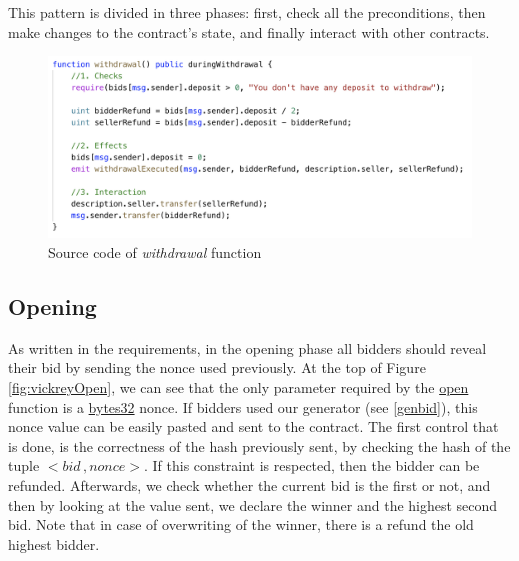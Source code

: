 \documentclass[runningheads,a4paper]{llncs}
\begin{document}
This pattern is divided in three phases: first, check all the preconditions, then make changes to the contract’s state, and finally interact with other contracts.

\begin{figure}[h]
\includegraphics[width=\linewidth]{images/withdrawal.png}
\centering
\caption{Source code of \emph{withdrawal} function}
\label{fig:vickreyWith}
\end{figure}


\newpage
\subsection{Opening}
As written in the requirements, in the opening phase all bidders should reveal their bid by sending the nonce used previously. At the top of Figure \ref{fig:vickreyOpen}, we can see that the only parameter required by the \url{open} function is a \url{bytes32} nonce. If bidders used our generator (see \ref{genbid}), this nonce value can be easily pasted and sent to the contract. The first control that is done, is the correctness of the hash previously sent, by checking the hash of the tuple \(<bid \, , nonce>\). If this constraint is respected, then the bidder can be refunded. Afterwards, we check whether the current bid is the first or not, and then by looking at the value sent, we declare the winner and the highest second bid. Note that in case of overwriting of the winner, there is a refund the old highest bidder.
\end{document}
